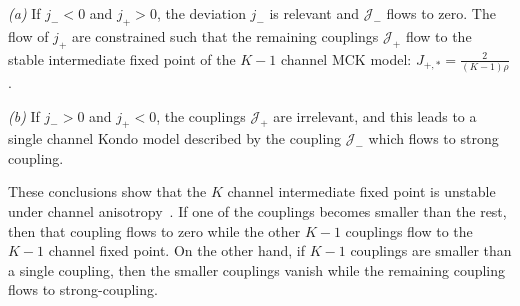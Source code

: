 \documentclass[reprint,prb,superscriptaddress]{revtex4-2}
\begin{document}
\par\textit{(a)} If \(j_-<0\) and \(j_+>0\), the deviation \(j_-\) is relevant and \(\mathcal{J}_-\) flows to zero. The flow of \(j_+\) are constrained such that the remaining couplings \(\mathcal{J}_+\) flow to the stable intermediate fixed point of the \(K-1\) channel MCK model: \(J_{+,*} = \frac{2}{(K-1)\rho}\).
\par\textit{(b)} If \(j_- > 0\) and \(j_+<0\), the couplings \(\mathcal{J}_+\) are irrelevant, and this leads to a single channel Kondo model described by the coupling \(\mathcal{J}_-\) which flows to strong coupling.

These conclusions show that the \(K\) channel intermediate fixed point is unstable under channel anisotropy~\cite{Noz_blandin_1980,andrei_jerez_1995,affleck_pang_cox_1992,zarand_2000}. If one of the couplings becomes smaller than the rest, then that coupling flows to zero while the other \(K-1\) couplings flow to the \(K-1\) channel fixed point. On the other hand, if \(K-1\) couplings are smaller than a single coupling, then the smaller couplings vanish while the remaining coupling flows to strong-coupling.
\end{document}
